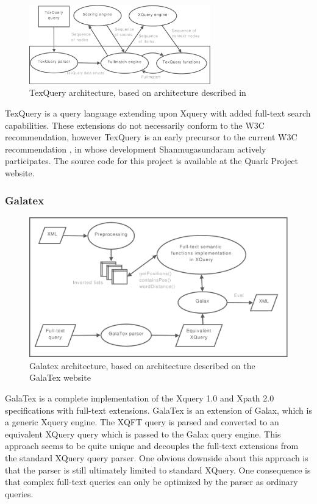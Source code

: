 \begin{figure}[!h]
  \centering
    \includegraphics[width=0.7\textwidth]{diagrams/texquery_arch}
  \caption[TexQuery architecture]{TexQuery architecture, based on architecture described in
  \cite{texquery_fulltextsearch}}
\end{figure}

TexQuery is a query language extending upon Xquery with added full-text search 
capabilities. These extensions do not necessarily conform to the W3C
recommendation, however TexQuery is an early precursor to the current W3C 
recommendation \cite{TEXQ00}, in whose development Shanmugasundaram actively 
participates. The source code for this project is available at the Quark Project
website\cite{quarkproject}.

\subsubsection{Galatex}
\begin{figure}[!h]
  \centering
    \includegraphics[width=1\textwidth]{diagrams/galatex_arch}
  \caption[GalaTex architecture]{Galatex architecture, based on architecture described on
  the GalaTex website\cite{galatex}}
\end{figure}

GalaTex is a complete implementation of the Xquery 1.0 and Xpath 2.0
specifications with full-text extensions. GalaTex is an extension of Galax,
which is a generic Xquery engine. The XQFT query is parsed and converted to an
equivalent XQuery query which is passed to the Galax query engine. This
approach seems to be quite unique and decouples the full-text extensions from
the standard XQuery query parser. One obvious downside about this approach is
that the parser is still ultimately limited to standard XQuery. One consequence
is that complex full-text queries can only be optimized by the parser as
ordinary queries.

